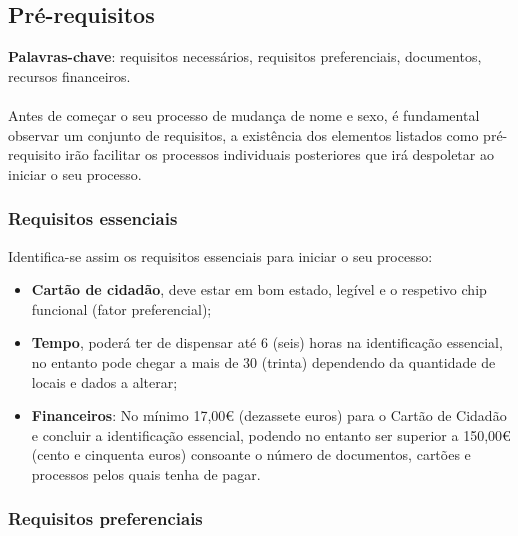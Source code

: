 \subsection{Pré-requisitos}

\textbf{Palavras-chave}: requisitos necessários, requisitos preferenciais, documentos, recursos financeiros. \\
\\
Antes de começar o seu processo de mudança de nome e sexo, é fundamental
observar um conjunto de requisitos, a existência dos elementos listados
como pré-requisito irão facilitar os processos individuais posteriores
que irá despoletar ao iniciar o seu processo.

\subsubsection{Requisitos essenciais}

Identifica-se assim os requisitos essenciais para iniciar o seu
processo:
\begin{itemize}
	\item \textbf{Cartão de cidadão}, deve estar em bom estado, legível e o respetivo chip funcional (fator preferencial);
	\item \textbf{Tempo}, poderá ter de dispensar até 6 (seis) horas na identificação essencial, no entanto pode chegar a mais de 30 (trinta) dependendo da quantidade de locais e dados a alterar;
	\item \textbf{Financeiros}: No mínimo 17,00€ (dezassete euros) para o Cartão de Cidadão e concluir a identificação essencial, podendo no entanto ser superior a 150,00€ (cento e cinquenta euros) consoante o número de documentos, cartões e processos pelos quais tenha de pagar.
\end{itemize}

\subsubsection{Requisitos preferenciais}

